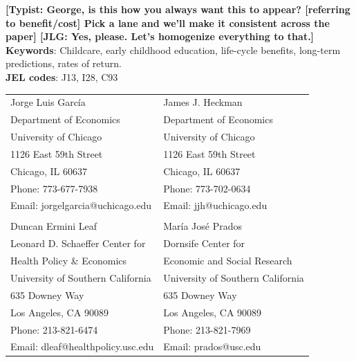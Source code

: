 \noindent  \textbf{[Typist: George, is this how you always want this to appear? [referring to benefit/cost] Pick a lane and we'll make it consistent across the paper] [JLG: Yes, please. Let's homogenize everything to that.]}\\

\noindent \textbf{Keywords}: Childcare, early childhood education, life-cycle benefits, long-term predictions, rates of return. \\
\noindent \textbf{JEL codes}: J13, I28, C93\\


\bigskip
\begin{tabular}{ll}
Jorge Luis Garc\'{i}a                                       & James J. Heckman \\
Department of Economics                                & Department of Economics \\
University of Chicago                                       & University of Chicago \\
1126 East 59th Street                                     & 1126 East 59th Street \\
Chicago, IL 60637                                           & Chicago, IL 60637 \\
Phone: 773-677-7938                                     & Phone: 773-702-0634  \\
Email: jorgelgarcia@uchicago.edu                       & Email: jjh@uchicago.edu \\
                                                                       & \\
Duncan Ermini Leaf                                           & Mar\'{i}a Jos\'{e} Prados \\
Leonard D. Schaeffer Center for            & Dornsife Center for  \\
Health Policy \& Economics                                          & Economic and Social Research \\
University of Southern California                        & University of Southern California \\
635 Downey Way                                             & 635 Downey Way        \\
Los Angeles, CA 90089                                    & Los Angeles, CA 90089 \\
Phone: 213-821-6474                                     & Phone: 213-821-7969 \\
Email: dleaf@healthpolicy.usc.edu                     & Email: prados@usc.edu \\

\end{tabular}

